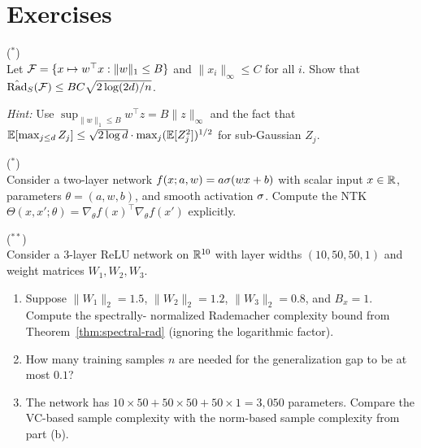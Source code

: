 \documentclass[11pt,a4paper]{article}
\begin{document}
\section{Exercises}
\label{sec:exercises}

\begin{exercise}
\textnormal{(\({}^*\))} \\
Let $\mathcal{F} = \{x \mapsto w^\top x : \|w\|_1 \le B\}$ and
$\|x_i\|_\infty \le C$ for all $i$.  Show that
$\hat{\mathrm{Rad}}_S(\mathcal{F}) \le BC \sqrt{2 \log(2d) / n}$.

\textit{Hint:} Use $\sup_{\|w\|_1 \le B} w^\top z = B \|z\|_\infty$
and the fact that $\mathbb{E}[\max_{j \le d} Z_j] \le \sqrt{2 \log d} \cdot
\max_j (\mathbb{E}[Z_j^2])^{1/2}$ for sub-Gaussian $Z_j$.
\end{exercise}

\begin{exercise}
\textnormal{(\({}^*\))} \\
Consider a two-layer network $f(x; a, w) = a \sigma(wx + b)$ with
scalar input $x \in \mathbb{R}$, parameters $\theta = (a, w, b)$, and smooth
activation $\sigma$.  Compute the NTK
$\Theta(x, x'; \theta) = \nabla_\theta f(x)^\top \nabla_\theta f(x')$
explicitly.
\end{exercise}

\begin{exercise}
\textnormal{(\({}^{**}\))} \\
Consider a $3$-layer ReLU network on $\mathbb{R}^{10}$ with layer widths
$(10, 50, 50, 1)$ and weight matrices $W_1, W_2, W_3$.
\begin{enumerate}[label=(\alph*)]
  \item Suppose $\|W_1\|_2 = 1.5$, $\|W_2\|_2 = 1.2$,
    $\|W_3\|_2 = 0.8$, and $B_x = 1$.  Compute the spectrally-
    normalized Rademacher complexity bound from
    Theorem~\ref{thm:spectral-rad} (ignoring the logarithmic factor).
  \item How many training samples $n$ are needed for the generalization
    gap to be at most $0.1$?
  \item The network has $10 \times 50 + 50 \times 50 + 50 \times 1 =
    3{,}050$ parameters.  Compare the VC-based sample complexity with
    the norm-based sample complexity from part (b).
\end{enumerate}
\end{exercise}
\end{document}

